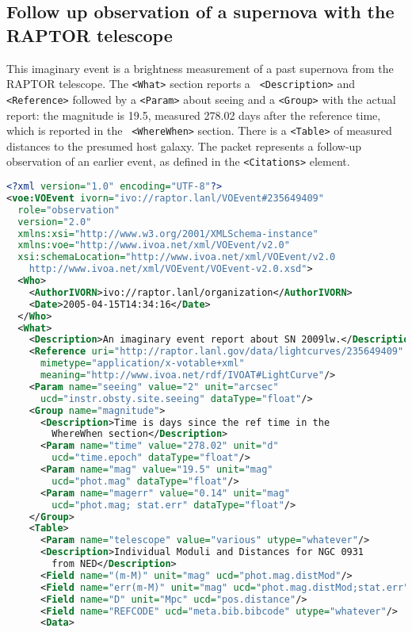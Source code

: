\documentclass[11pt,a4paper]{ivoa}
\begin{document}
\subsection{Follow up observation of a supernova with the RAPTOR telescope}
This imaginary event is a brightness measurement of a past supernova from the 
RAPTOR \citep{bib10} telescope. The {\tt <What>} section reports a {\tt 
<Description>} and {\tt <Reference>} followed by a {\tt <Param>} about seeing 
and a {\tt <Group>} with the actual report: the magnitude is 19.5, measured 
278.02 days after the reference time, which is reported in the {\tt 
<WhereWhen>} section. There is a {\tt <Table>} of measured distances to the 
presumed host galaxy. The packet represents a follow-up observation of an 
earlier event, as defined in the {\tt <Citations>} element. 
\begin{lstlisting}[language=XML]
<?xml version="1.0" encoding="UTF-8"?>
<voe:VOEvent ivorn="ivo://raptor.lanl/VOEvent#235649409" 
  role="observation" 
  version="2.0"
  xmlns:xsi="http://www.w3.org/2001/XMLSchema-instance"
  xmlns:voe="http://www.ivoa.net/xml/VOEvent/v2.0"
  xsi:schemaLocation="http://www.ivoa.net/xml/VOEvent/v2.0
    http://www.ivoa.net/xml/VOEvent/VOEvent-v2.0.xsd">
  <Who>
    <AuthorIVORN>ivo://raptor.lanl/organization</AuthorIVORN>
    <Date>2005-04-15T14:34:16</Date>
  </Who>
  <What>
    <Description>An imaginary event report about SN 2009lw.</Description>
    <Reference uri="http://raptor.lanl.gov/data/lightcurves/235649409"
      mimetype="application/x-votable+xml"
      meaning="http://www.ivoa.net/rdf/IVOAT#LightCurve"/>
    <Param name="seeing" value="2" unit="arcsec"
      ucd="instr.obsty.site.seeing" dataType="float"/>
    <Group name="magnitude">
      <Description>Time is days since the ref time in the
        WhereWhen section</Description>
      <Param name="time" value="278.02" unit="d"
        ucd="time.epoch" dataType="float"/>
      <Param name="mag" value="19.5" unit="mag"
        ucd="phot.mag" dataType="float"/>
      <Param name="magerr" value="0.14" unit="mag"
        ucd="phot.mag; stat.err" dataType="float"/>
    </Group>
    <Table>
      <Param name="telescope" value="various" utype="whatever"/>
      <Description>Individual Moduli and Distances for NGC 0931
        from NED</Description>
      <Field name="(m-M)" unit="mag" ucd="phot.mag.distMod"/>
      <Field name="err(m-M)" unit="mag" ucd="phot.mag.distMod;stat.err"/>
      <Field name="D" unit="Mpc" ucd="pos.distance"/>
      <Field name="REFCODE" ucd="meta.bib.bibcode" utype="whatever"/>
      <Data>

\end{lstlisting}
\end{document}
